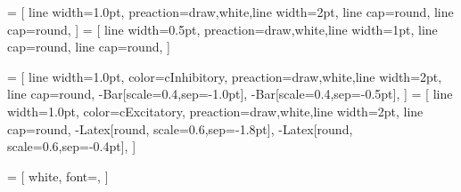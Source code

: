 \usepackage{tikz}
\usepackage{svg}

\usetikzlibrary{shapes.geometric}
\usetikzlibrary{arrows.meta}
\usetikzlibrary{positioning}
\usetikzlibrary{calc}
\usetikzlibrary{backgrounds}
\usetikzlibrary{fit}
\usetikzlibrary{fadings}
\usetikzlibrary{decorations}

\usepackage{rotating}



 = [
    line width=1.0pt,
    preaction={draw,white,line width=2pt, line cap=round},
    line cap=round,
    ]
 = [
    line width=0.5pt,
    preaction={draw,white,line width=1pt, line cap=round},
    line cap=round,
    ]

 = [
    line width=1.0pt,
    color=cInhibitory,
    preaction={draw,white,line width=2pt, line cap=round, -{Bar[scale=0.4,sep=-1.0pt]}},
    -{Bar[scale=0.4,sep=-0.5pt]},
    ]
 = [
    line width=1.0pt,
    color=cExcitatory,
    preaction={draw,white,line width=2pt, line cap=round, -{Latex[round, scale=0.6,sep=-1.8pt]}},
    -{Latex[round, scale=0.6,sep=-0.4pt]},
    ]

 = [
    white,
    font=\sffamily\small,
    ]


